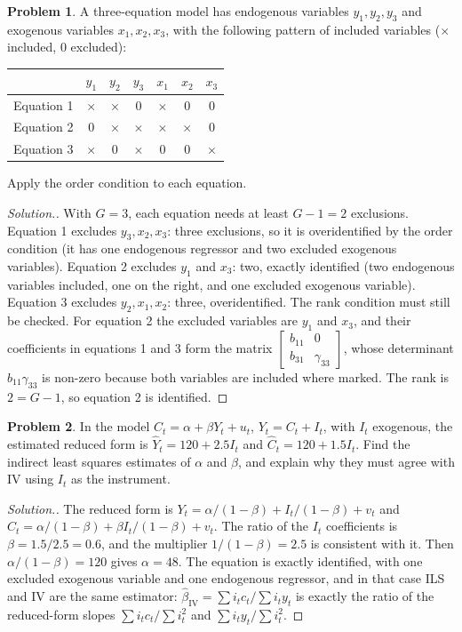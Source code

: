 \documentclass[11pt,a4paper]{article}
\numberwithin{equation}{section}
\theoremstyle{definition}
\newtheorem{problemx}{Problem}[subsection]
\newenvironment{problem}{\begin{problemx}}{\end{problemx}}
\newenvironment{solution}
  {\renewcommand{\qedsymbol}{}\begin{proof}[\textit{Solution}.]}
  {\end{proof}}
\begin{document}
\begin{problem}
A three-equation model has endogenous variables $y_1, y_2, y_3$ and exogenous variables $x_1, x_2, x_3$, with the following pattern of included variables
($\times$ included, $0$ excluded):
\begin{center}
\begin{tabular}{lcccccc}
& $y_1$ & $y_2$ & $y_3$ & $x_1$ & $x_2$ & $x_3$\\
\hline
Equation 1 & $\times$ & $\times$ & $0$ & $\times$ & $0$ & $0$\\
Equation 2 & $0$ & $\times$ & $\times$ & $\times$ & $\times$ & $0$\\
Equation 3 & $\times$ & $0$ & $\times$ & $0$ & $0$ & $\times$
\end{tabular}
\end{center}
Apply the order condition to each equation.
\end{problem}

\begin{solution}
With $G = 3$, each equation needs at least $G - 1 = 2$ exclusions. Equation 1 excludes $y_3, x_2, x_3$: three exclusions, so it is overidentified by the order
condition (it has one endogenous regressor and two excluded exogenous variables). Equation 2 excludes $y_1$ and $x_3$: two, exactly identified (two
endogenous variables included, one on the right, and one excluded exogenous variable). Equation 3 excludes $y_2, x_1, x_2$: three, overidentified. The rank
condition must still be checked. For equation 2 the excluded variables are $y_1$ and $x_3$, and their coefficients in equations 1 and 3 form the matrix
$\begin{bmatrix} b_{11} & 0\\ b_{31} & \gamma_{33}\end{bmatrix}$, whose determinant $b_{11}\gamma_{33}$ is non-zero because both variables are included where marked. The rank is $2 = G - 1$, so equation 2
is identified.
\end{solution}

\begin{problem}
In the model $C_t = \alpha + \beta Y_t + u_t$, $Y_t = C_t + I_t$, with $I_t$ exogenous, the estimated reduced form is $\hat Y_t = 120 + 2.5I_t$ and $\hat C_t = 120 + 1.5I_t$.
Find the indirect least squares estimates of $\alpha$ and $\beta$, and explain why they must agree with IV using $I_t$ as the instrument.
\end{problem}

\begin{solution}
The reduced form is $Y_t = \alpha/(1 - \beta) + I_t/(1 - \beta) + v_t$ and $C_t = \alpha/(1 - \beta) + \beta I_t/(1 - \beta) + v_t$. The ratio of the $I_t$ coefficients is $\beta = 1.5/2.5 = 0.6$, and the multiplier
$1/(1 - \beta) = 2.5$ is consistent with it. Then $\alpha/(1 - \beta) = 120$ gives $\alpha = 48$. The equation is exactly identified, with one excluded exogenous variable and one
endogenous regressor, and in that case ILS and IV are the same estimator: $\hat\beta_{\text{IV}} = \sum i_tc_t/\sum i_ty_t$ is exactly the ratio of the reduced-form slopes $\sum i_tc_t/\sum i_t^2$
and $\sum i_ty_t/\sum i_t^2$.
\end{solution}
\end{document}

